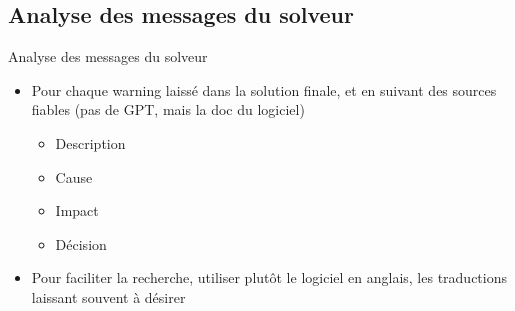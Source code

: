 \subsection{Analyse des messages du solveur}
\label{sec:Analyse des messages du solveur}

\begin{frame}[c]{Analyse des messages du solveur}
    \begin{itemize}
        \item Pour chaque warning laissé dans la solution finale, et en suivant des sources fiables (pas de GPT, mais la doc du logiciel)
        \begin{itemize}
            \item Description
            \item Cause
            \item Impact
            \item Décision
        \end{itemize}
        \item Pour faciliter la recherche, utiliser plutôt le logiciel en anglais, les traductions laissant souvent à désirer
    \end{itemize}
\end{frame}